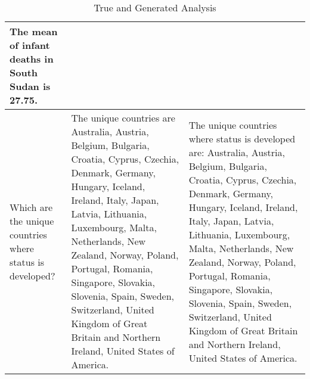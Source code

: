 \documentclass[11pt]{article}
\begin{document}
\begin{table*}[t]
\begin{tabular}{|p{}|p{}|p{}|}
The mean of infant deaths in South Sudan is 27.75. \\ \hline
Which are the unique countries where status is developed? & 
The unique countries are Australia, Austria, Belgium, Bulgaria, Croatia, Cyprus, Czechia, Denmark, Germany, Hungary, Iceland, Ireland, Italy, Japan, Latvia, Lithuania, Luxembourg, Malta, Netherlands, New Zealand, Norway, Poland, Portugal, Romania, Singapore, Slovakia, Slovenia, Spain, Sweden, Switzerland, United Kingdom of Great Britain and Northern Ireland, United States of America. & 
The unique countries where status is developed are: Australia, Austria, Belgium, Bulgaria, Croatia, Cyprus, Czechia, Denmark, Germany, Hungary, Iceland, Ireland, Italy, Japan, Latvia, Lithuania, Luxembourg, Malta, Netherlands, New Zealand, Norway, Poland, Portugal, Romania, Singapore, Slovakia, Slovenia, Spain, Sweden, Switzerland, United Kingdom of Great Britain and Northern Ireland, United States of America. \\ \hline
\end{tabular}
\caption{True and Generated Analysis}
\label{append:7}
\end{table*}
\end{document}
